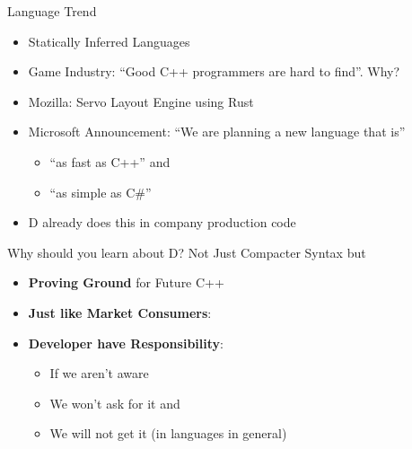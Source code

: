 \documentclass[xcolor=dvipsnames]{beamer}
\begin{document}
\begin{frame}[fragile]{Language Trend}
  \begin{itemize}[<+->]
  \item Statically Inferred Languages
  \item Game Industry: ``Good C++ programmers are hard to find''. Why?
  \item Mozilla: Servo Layout Engine using Rust
  \item Microsoft Announcement: ``We are planning a new language that is''
    \begin{itemize}[<+->]
    \item ``as fast as C++'' and
    \item ``as simple as C\#''
    \end{itemize}
  \item D already does this in company production code
  \end{itemize}
\end{frame}

\begin{frame}[fragile]{Why should you learn about D?}
  Not Just Compacter Syntax but
  \begin{itemize}[<+->]
  \item \textbf{Proving Ground} for Future C++
  \item \textbf{Just like Market Consumers}:
  \item \textbf{Developer have Responsibility}:
    \begin{itemize}[<+->]
    \item If we aren't aware
    \item We won't ask for it and
    \item We will not get it (in languages in general)
    \end{itemize}
  \end{itemize}
\end{frame}
\end{document}
